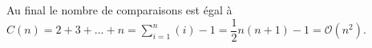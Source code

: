 Au final le nombre de comparaisons est égal à $C(n) = 2+3+...+n = \sum \limits_{i=1}^n \left(i\right)  -1 = \dfrac{1}{2}n\left(n+1\right) -1 = \mathcal{O}(n^2)$.







%
%
%
